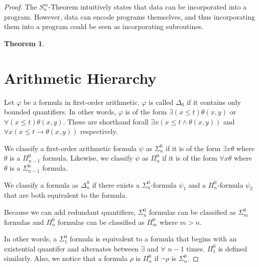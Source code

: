 \documentclass[a4paper,10pt]{article}
\newenvironment{definition}[1][Definition]{\begin{trivlist}
\item[\hskip \labelsep {\bfseries #1}]}{\end{trivlist}}
\newtheorem{theorem}{Theorem}[section]
\let\phi\varphi
\newcommand*\map{\rightarrow}
\newcommand*\n{\newline\par}
\begin{document}
\begin{proof}
   The $S_n^m$-Theorem intuitively states that data can be incorporated into a program. However, data can encode programs themselves, and thus incorporating them into a program could be seen as incorporating subroutines.
    
   \begin{theorem}
    
   \end{theorem}
 
    
    
    
   \newpage
   \section{Arithmetic Hierarchy}
   
    \begin{definition}
    Let $\phi$ be a formula in first-order arithmetic. $\phi$ is called $\Delta_0$ if it contains only bounded quantifiers. In other words, $\phi$ is of the form $\exists(x \leq t)\theta(x,y)$ or $\forall(x \leq t)\theta(x,y)$. These are shorthand forall
    $\exists x (x \leq t \land \theta(x,y))$ and $\forall x (x \leq t \map \theta(x,y))$ respectively.
    \end{definition}

    \begin{definition}
      We classify a first-order arithmetic formula $\psi$ as $\Sigma_n^0$ if it is of the form $\exists x \theta$ where $\theta$ is a $\Pi_{n-1}^0$ formula. Likewise, we classify $\psi$ as $\Pi_{n}^0$
      if it is of the form $\forall x \theta$ where $\theta$ is a $\Sigma_{n-1}^0$ formula.
    \end{definition}
    
    \begin{definition}
     We classify a formula as $\Delta_n^0$ if there exists a $\Sigma_n^0$-formula $\psi_1$ and a $\Pi_n^0$-formula $\psi_2$ that are both equivalent to the formula.
    \end{definition}

    
    Because we can add redundant quantifiers, $\Sigma_n^0$ formulas can be classified as $\Sigma_m^0$ formulas and $\Pi_n^0$  formulas can be classified as $\Pi_m^0$ where $m > n$. \n
    
    
    In other words, a $\Sigma_1^0$ formula is equivalent to a formula that begins with an existential quantifer and alternates between $\exists$ and $\forall$ $n-1$ times. $\Pi_1^0$ is defined similarly. 
    Also, we notice that a formula $\rho$ is $\Pi_n^0$ if $\neg\rho$ is $\Sigma_n^0$.  \n
    

\end{proof}
\end{document}
